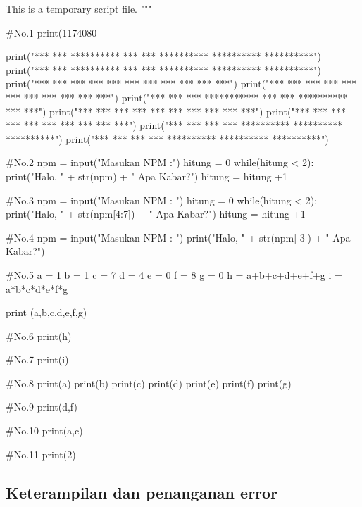This is a temporary script file.
"""

#No.1
print(1174080%

print("***  ***  **********  ***     ***  **********  **********  **********")
print("***  ***  **********  ***     ***  **********  **********  **********")
print("***  ***         ***  ***     ***  ***    ***  ***    ***  ***    ***")
print("***  ***        ***   ***     ***  ***    ***  ***    ***  ***    ***")
print("***  ***       ***    ***********  ***    ***  **********  ***    ***")
print("***  ***      ***             ***  ***    ***  ***    ***  ***    ***")
print("***  ***     ***              ***  ***    ***  ***    ***  ***    ***")
print("***  ***    ***               ***  **********  **********  **********")
print("***  ***   ***                ***  **********  **********  **********")

#No.2
npm = input("Masukan NPM :")
hitung = 0
while(hitung < 2):
    print("Halo, " + str(npm) + " Apa Kabar?")
    hitung = hitung +1

#No.3
npm = input("Masukan NPM : ")
hitung = 0
while(hitung < 2):
    print("Halo, " + str(npm[4:7]) + " Apa Kabar?")
    hitung = hitung +1
    
#No.4
npm = input("Masukan NPM : ")
print("Halo, " + str(npm[-3]) + " Apa Kabar?")

#No.5
a = 1
b = 1
c = 7
d = 4
e = 0
f = 8
g = 0
h = a+b+c+d+e+f+g
i = a*b*c*d*e*f*g

print (a,b,c,d,e,f,g)

#No.6
print(h)

#No.7
print(i)

#No.8
print(a)
print(b)
print(c)
print(d)
print(e)
print(f)
print(g)

#No.9
print(d,f)

#No.10
print(a,c)

#No.11
print(2)

\subsection{Keterampilan dan penanganan error}

